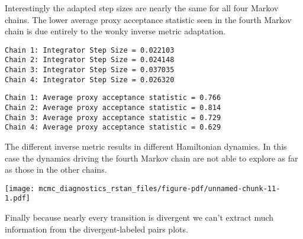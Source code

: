 \documentclass[
  letterpaper,
  DIV=11,
  numbers=noendperiod]{scrartcl}
\newenvironment{Shaded}{\begin{snugshade}}{\end{snugshade}}
\newcommand{\FunctionTok}[1]{\textcolor[rgb]{0.28,0.35,0.67}{#1}}
\newcommand{\NormalTok}[1]{\textcolor[rgb]{0.00,0.23,0.31}{#1}}
\newcommand{\SpecialCharTok}[1]{\textcolor[rgb]{0.37,0.37,0.37}{#1}}
\begin{document}
Interestingly the adapted step sizes are nearly the same for all four
Markov chains. The lower average proxy acceptance statistic seen in the
fourth Markov chain is due entirely to the wonky inverse metric
adaptation.

\begin{Shaded}
\end{Shaded}

\begin{verbatim}
Chain 1: Integrator Step Size = 0.022103
Chain 2: Integrator Step Size = 0.024148
Chain 3: Integrator Step Size = 0.037035
Chain 4: Integrator Step Size = 0.026320
\end{verbatim}

\begin{Shaded}
\end{Shaded}

\begin{verbatim}
Chain 1: Average proxy acceptance statistic = 0.766
Chain 2: Average proxy acceptance statistic = 0.814
Chain 3: Average proxy acceptance statistic = 0.729
Chain 4: Average proxy acceptance statistic = 0.629
\end{verbatim}

The different inverse metric results in different Hamiltonian dynamics.
In this case the dynamics driving the fourth Markov chain are not able
to explore as far as those in the other chains.

\begin{Shaded}
\end{Shaded}

\texttt{[image: mcmc\_diagnostics\_rstan\_files/figure-pdf/unnamed-chunk-11-1.pdf]}

Finally because nearly every transition is divergent we can't extract
much information from the divergent-labeled pairs plots.
\end{document}
